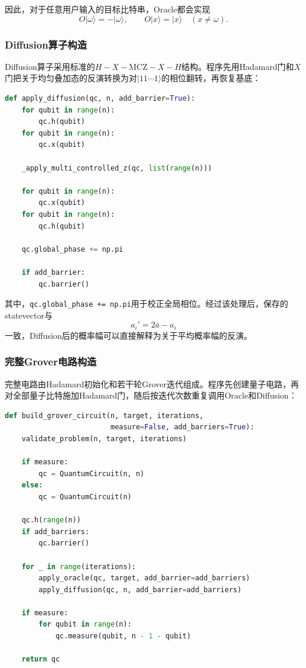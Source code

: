 因此，对于任意用户输入的目标比特串，Oracle都会实现
\[
    O|\omega\rangle=-|\omega\rangle,\qquad O|x\rangle=|x\rangle\quad(x\ne \omega).
\]

\subsubsection{Diffusion算子构造}

Diffusion算子采用标准的\(H-X-\mathrm{MCZ}-X-H\)结构。程序先用Hadamard门和\(X\)门把关于均匀叠加态的反演转换为对\(|11\cdots 1\rangle\)的相位翻转，再恢复基底：

\begin{lstlisting}[language=Python]
def apply_diffusion(qc, n, add_barrier=True):
    for qubit in range(n):
        qc.h(qubit)
    for qubit in range(n):
        qc.x(qubit)

    _apply_multi_controlled_z(qc, list(range(n)))

    for qubit in range(n):
        qc.x(qubit)
    for qubit in range(n):
        qc.h(qubit)

    qc.global_phase += np.pi

    if add_barrier:
        qc.barrier()
\end{lstlisting}

其中，\texttt{qc.global\_phase += np.pi}用于校正全局相位。经过该处理后，保存的statevector与
\[
    a_i'=2\bar{a}-a_i
\]
一致，Diffusion后的概率幅可以直接解释为关于平均概率幅的反演。

\subsubsection{完整Grover电路构造}

完整电路由Hadamard初始化和若干轮Grover迭代组成。程序先创建量子电路，再对全部量子比特施加Hadamard门，随后按迭代次数重复调用Oracle和Diffusion：

\begin{lstlisting}[language=Python]
def build_grover_circuit(n, target, iterations,
                         measure=False, add_barriers=True):
    validate_problem(n, target, iterations)

    if measure:
        qc = QuantumCircuit(n, n)
    else:
        qc = QuantumCircuit(n)

    qc.h(range(n))
    if add_barriers:
        qc.barrier()

    for _ in range(iterations):
        apply_oracle(qc, target, add_barrier=add_barriers)
        apply_diffusion(qc, n, add_barrier=add_barriers)

    if measure:
        for qubit in range(n):
            qc.measure(qubit, n - 1 - qubit)

    return qc
\end{lstlisting}

